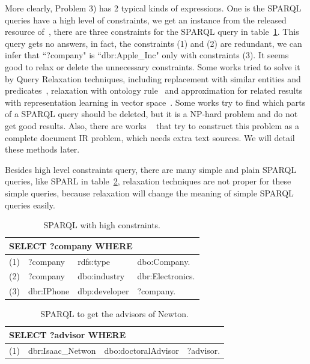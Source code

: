 \documentclass[runningheads]{llncs}
\begin{document}
More clearly, Problem 3) has 2 typical kinds of expressions.
One is the SPARQL queries have a high level of constraints, we get an instance from the released resource of~\cite{wangEmbed}, there are three constraints for the SPARQL query in table~\ref{Over_C_Example}. This query gets no answers, in fact, the constraints (1) and (2) are redundant, we can infer that ``?company" is ``dbr:Apple\_Inc" only with constraints (3). It seems good to relax or delete the unnecessary constraints. Some works tried to solve it by Query Relaxation techniques, including replacement with similar entities and predicates~\cite{elbassuoni2011query}, relaxation with ontology rule~\cite{2010combining} and approximation for related results with representation learning in vector space~\cite{wangEmbed, hamilton2018embedding, zhang2018trquery}. Some works try to find which parts of a SPARQL query should be deleted, but it is a NP-hard problem and do not get good results. Also, there are works ~\cite{huang2012} that try to construct this problem as a complete document IR problem, which needs extra text sources. We will detail these methods later.

Besides high level constraints query, there are many simple and plain SPARQL queries, like SPARL in table~\ref{Newton}, relaxation techniques are not proper for these simple queries, because relaxation will change the meaning of simple SPARQL queries easily.

\begin{table}
\caption{SPARQL with high constraints.}\label{Over_C_Example}
\centering
\begin{tabular}{|c|lll|}
\hline
\multicolumn{4}{|l|}{SELECT ?company WHERE }\\
\hline
(1) &  ?company & rdfs:type & dbo:Company.\\
(2) &  ?company  & dbo:industry  & dbr:Electronics.\\
(3) & dbr:IPhone & dbp:developer & ?company.\\
\hline
\end{tabular}
\end{table}

\begin{table}
\caption{SPARQL to get the advisors of Newton.}\label{Newton}
\centering
\begin{tabular}{|c|lll|}
\hline
\multicolumn{4}{|l|}{SELECT ?advisor WHERE }\\
\hline
(1) &  dbr:Isaac\_Netwon & dbo:doctoralAdvisor & ?advisor.\\
\hline
\end{tabular}
\end{table}
\end{document}
